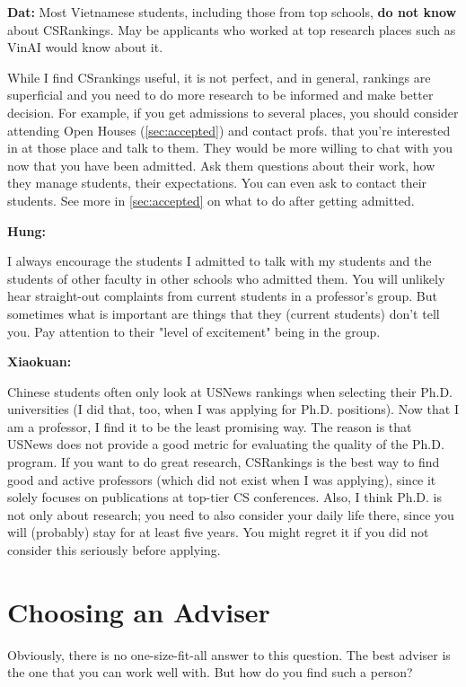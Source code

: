\documentclass[oneside,11pt,dvipsnames]{book}
\newenvironment{commentbox}[1][]{
  \small
  \begin{mybox}
    {\small \textbf{#1}}
  }{
  \end{mybox}
}
\begin{document}
\begin{commentbox}[Dat:] Most Vietnamese students, including those from top schools, \textbf{do not know} about CSRankings.  May be applicants who worked at top research places such as VinAI would know about it.
\end{commentbox}

While I find CSrankings useful, it is not perfect, and in general, rankings are superficial and you need to do more research to be informed and make better decision. For example, if you get admissions to several places, you should consider attending Open Houses (\autoref{sec:accepted}) and contact profs. that you're interested in at those place and talk to them. They would be more willing to chat with you now that you have been admitted.  Ask them questions about their work, how they manage students, their expectations. You can even ask to contact their students. See more in \autoref{sec:accepted} on what to do after getting admitted.


\begin{commentbox}[Hung:]
  I always encourage the students I admitted to talk with my students and the students of other faculty in other schools who admitted them. You will unlikely hear straight-out complaints from current students in a professor’s group. But sometimes what is important are things that they (current students) don’t tell you. Pay attention to their "level of excitement" being in the group.
\end{commentbox}

\begin{commentbox}[Xiaokuan:]
  Chinese students often only look at USNews rankings when selecting their Ph.D. universities (I did that, too, when I was applying for Ph.D. positions).
  Now that I am a professor, I find it to be the least promising way.
  The reason is that USNews does not provide a good metric for evaluating the quality of the Ph.D. program.
  If you want to do great research, CSRankings is the best way to find good and active professors (which did not exist when I was applying),
  since it solely focuses on publications at top-tier CS conferences.
  Also,
  I think Ph.D. is not only about research;
  you need to also consider your daily life there, since you will (probably) stay for at least five years.
  You might regret it if you did not consider this seriously before applying.
\end{commentbox}

\section{Choosing an Adviser}
Obviously, there is no one-size-fit-all answer to this question. The best adviser is the one that you can work well with.  But how do you find such a person?
\end{document}
